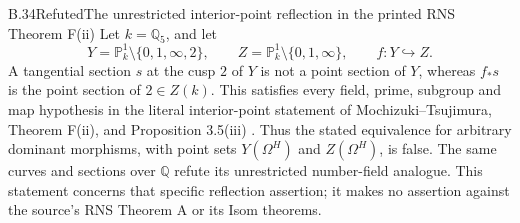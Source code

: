 \begin{statement}{B.34}{Refuted}{The unrestricted interior-point reflection in the printed RNS Theorem F(ii)}
Let $k=\mathbb Q_5$, and let
\[
 Y=\mathbb P^1_k\setminus\{0,1,\infty,2\},\qquad
 Z=\mathbb P^1_k\setminus\{0,1,\infty\},\qquad
 f:Y\hookrightarrow Z.
\]
A tangential section $s$ at the cusp $2$ of $Y$ is not a
point section of $Y$, whereas $f_*s$ is the point section of
$2\in Z(k)$. This satisfies every field, prime, subgroup and
map hypothesis in the literal interior-point statement of
Mochizuki--Tsujimura, Theorem F(ii), and Proposition 3.5(iii)
\cite{A_MochizukiTsujimuraRNS}. Thus the stated equivalence for
arbitrary dominant morphisms, with point sets $Y(\Omega^H)$
and $Z(\Omega^H)$, is false. The same curves and sections
over $\mathbb Q$ refute its unrestricted number-field analogue.
This statement concerns that specific reflection assertion;
it makes no assertion against the source's RNS Theorem A or
its Isom theorems.
\end{statement}
